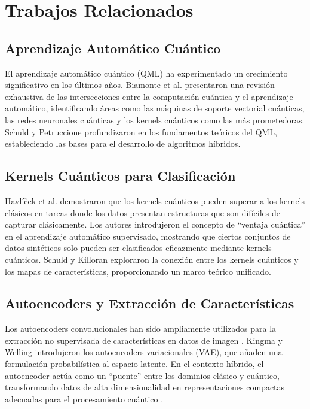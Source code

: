 \documentclass[conference]{IEEEtran}
\begin{document}
\section{Trabajos Relacionados}
\label{sec:related}

\subsection{Aprendizaje Automático Cuántico}

El aprendizaje automático cuántico (QML) ha experimentado un crecimiento 
significativo en los últimos años. Biamonte et al. \cite{biamonte2017quantum} 
presentaron una revisión exhaustiva de las intersecciones entre la computación 
cuántica y el aprendizaje automático, identificando áreas como las máquinas de 
soporte vectorial cuánticas, las redes neuronales cuánticas y los kernels 
cuánticos como las más prometedoras. Schuld y Petruccione \cite{schuld2019machine} 
profundizaron en los fundamentos teóricos del QML, estableciendo las bases para 
el desarrollo de algoritmos híbridos.

\subsection{Kernels Cuánticos para Clasificación}

Havlíček et al. \cite{havlicek2019supervised} demostraron que los kernels 
cuánticos pueden superar a los kernels clásicos en tareas donde los datos 
presentan estructuras que son difíciles de capturar clásicamente. Los autores 
introdujeron el concepto de ``ventaja cuántica'' en el aprendizaje automático 
supervisado, mostrando que ciertos conjuntos de datos sintéticos solo pueden 
ser clasificados eficazmente mediante kernels cuánticos. Schuld y Killoran 
\cite{schuld2019quantum} exploraron la conexión entre los kernels cuánticos y 
los mapas de características, proporcionando un marco teórico unificado.

\subsection{Autoencoders y Extracción de Características}

Los autoencoders convolucionales han sido ampliamente utilizados para la 
extracción no supervisada de características en datos de imagen 
\cite{masci2011stacked}. Kingma y Welling \cite{kingma2013auto} introdujeron 
los autoencoders variacionales (VAE), que añaden una formulación probabilística 
al espacio latente. En el contexto híbrido, el autoencoder actúa como un 
``puente'' entre los dominios clásico y cuántico, transformando datos de alta 
dimensionalidad en representaciones compactas adecuadas para el procesamiento 
cuántico \cite{slabbert2024hybrid}.
\end{document}
